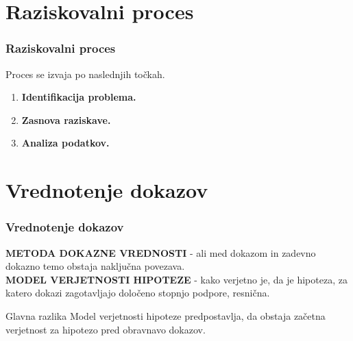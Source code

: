 \documentclass{beamer}
\begin{document}
\section{Raziskovalni proces}
\begin{frame}
    \frametitle{Raziskovalni proces}
    Proces se izvaja po naslednjih točkah.\\ \vspace{2mm}
    \begin{enumerate}
        \item \textbf{Identifikacija problema.\\} 
        \item \textbf{Zasnova raziskave.\\} 
        \item \textbf{Analiza podatkov.\\}
    \end{enumerate}
\end{frame}

\section{Vrednotenje dokazov}
\begin{frame}
   \frametitle{Vrednotenje dokazov}
   \textbf{METODA DOKAZNE VREDNOSTI} - ali med dokazom in zadevno dokazno temo obstaja naključna povezava.\\ \vspace{3mm}
   \textbf{MODEL VERJETNOSTI HIPOTEZE} - kako verjetno je, da je hipoteza, za katero dokazi zagotavljajo določeno stopnjo podpore, resnična.\\ \vspace{5mm}
   \begin{beamerboxesrounded}[]{Glavna razlika}
      Model verjetnosti hipoteze predpostavlja, da obstaja začetna verjetnost za hipotezo 
      pred obravnavo dokazov.
   \end{beamerboxesrounded} \vspace{3mm}
\end{frame}

\end{document}
